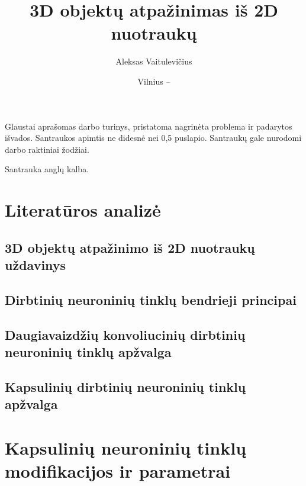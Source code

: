 \documentclass{VUMIFInfMagistrinis}
\title{3D objektų atpažinimas iš 2D nuotraukų}
\author{Aleksas Vaitulevičius}
\date{Vilnius – \the\year}
\begin{document}
\maketitle

Glaustai aprašomas darbo turinys, pristatoma nagrinėta problema ir padarytos
išvados. Santraukos apimtis ne didesnė nei 0,5 puslapio. Santraukų gale
nurodomi darbo raktiniai žodžiai. 

Santrauka anglų kalba.

\tableofcontents



\section{Literatūros analizė}

\subsection{3D objektų atpažinimo iš 2D nuotraukų uždavinys}


\subsection{Dirbtinių neuroninių tinklų bendrieji principai}




\subsection{Daugiavaizdžių konvoliucinių dirbtinių neuroninių tinklų apžvalga}




\subsection{Kapsulinių dirbtinių neuroninių tinklų apžvalga}


\section{Kapsulinių neuroninių tinklų modifikacijos ir parametrai}
\end{document}
